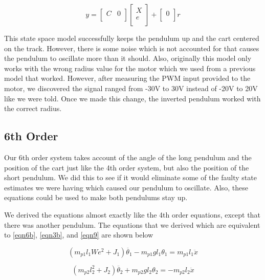 \documentclass{article}
\begin{document}
\begin{equation}
\label{ss4}
y = 
\begin{bmatrix}
C&0\\
\end{bmatrix}
\begin{bmatrix}
X\\
e\\
\end{bmatrix} +
\begin{bmatrix}
0\\
\end{bmatrix} r
\end{equation}

This state space model successfully keeps the pendulum up and the cart centered on the track. However, there is some noise which is not accounted for that causes the pendulum to oscillate more than it should. Also, originally this model only works with the wrong radius value for the motor which we used from a previous model that worked. However, after measuring the PWM input provided to the motor, we discovered the signal ranged from -30V to 30V instead of -20V to 20V like we were told. Once we made this change, the inverted pendulum worked with the correct radius.

\subsection{6th Order}
Our 6th order system takes account of the angle of the long pendulum and the position of the cart just like the 4th order system, but also the position of the short pendulum. We did this to see if it would eliminate some of the faulty state estimates we were having which caused our pendulum to oscillate. Also, these equations could be used to make both pendulums stay up.

We derived the equations almost exactly like the 4th order equations, except that there was another pendulum. The equations that we derived which are equivalent to \ref{eqn6b}, \ref{eqn3b}, and \ref{eqn9} are shown below

\begin{equation} 
\label{eqn6th1}
(m_{p1} l_1We^2+J_1) \ddot{\theta_1}-m_{p1} g l_1 \theta_1 = m_{p1} l_1 \ddot{x}
\end{equation}

\begin{equation} 
\label{eqn6th2}
(m_{p2} l_2^2+J_2) \ddot{\theta_2}+m_{p2} g l_2 \theta_2 = -m_{p2} l_2 \ddot{x}
\end{equation}
\end{document}

